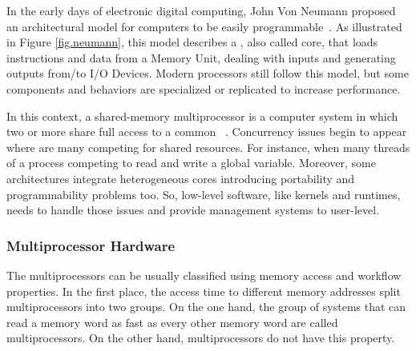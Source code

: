 		

		In the early days of electronic digital computing, John Von Neumann
		proposed an architectural model for computers to be easily programmable~\cite{von-neumann:model}.
		As illustrated in Figure \ref{fig.neumann}, this model describes a \cpu,
		also called core, that loads instructions and data from a Memory Unit,
		dealing with inputs and generating outputs from/to I/O Devices.
		Modern processors still follow this model, but some components and
		behaviors are specialized or replicated to increase performance.

		In this context, a shared-memory multiprocessor is a computer system
		in which two or more \cpus share full access to a common \ram~\cite{tanenbaum:4ed}.
		Concurrency issues begin to appear where are many \cpus competing for
		shared resources.
		For instance, when many threads of a process competing to read and write a global variable.
		Moreover, some architectures integrate heterogeneous cores introducing portability
		and programmability problems too.
		So, low-level software, like \os kernels and runtimes, needs to handle those
		issues and provide management systems to user-level.

		\subsubsection{Multiprocessor Hardware}
		\label{sec.multiprocessor-hw}

			The multiprocessors can be usually classified using memory access
			and workflow properties.
			In the first place, the access time to different memory addresses
			split multiprocessors into two groups.
			On the one hand, the group of systems that can read a memory word
			as fast as every other memory word are called \uma multiprocessors.
			On the other hand, \numa multiprocessors do not have this property.

